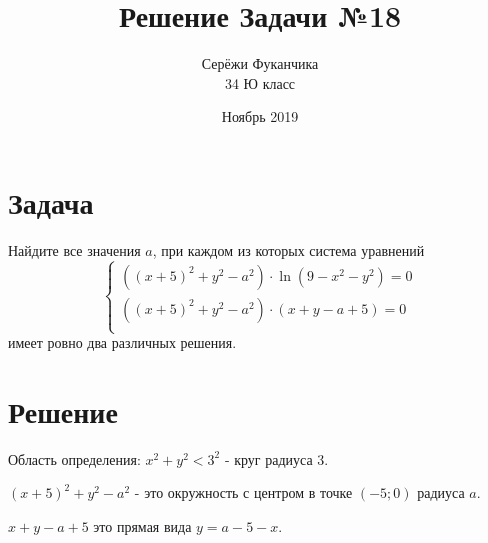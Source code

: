 \documentclass{article}
\title{Решение Задачи №18}
\author{Серёжи Фуканчика\\34 Ю класс}
\date{Ноябрь 2019}
\begin{document}
\maketitle

\section{Задача}
Найдите все значения $a$, при каждом из которых система уравнений
$$
\begin{cases}
  \left((x+5)^2+y^2-a^2\right)\cdot{}\ln{\left(9-x^2-y^2\right)}=0 \\ 
  \left((x+5)^2+y^2-a^2\right)\cdot{}\left(x+y-a+5\right)=0 \\ 
\end{cases}
$$
имеет ровно два различных решения.
\section{Решение}
Область определения: $x^2+y^2<3^2$ - круг радиуса 3.

$(x+5)^2+y^2-a^2$ - это окружность с центром в точке $(-5;0)$ радиуса $a$.

$x+y-a+5$ это прямая вида $y=a-5-x$.

\end{document}
